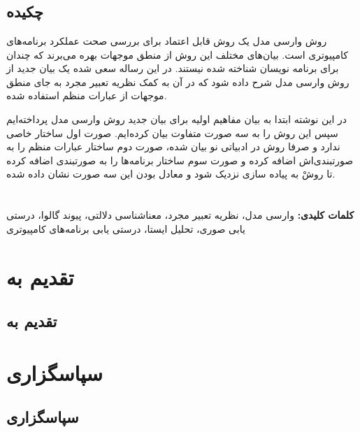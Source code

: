 \documentclass[12pt]{report}
\begin{document}
\newpage
\pagestyle{plain}
\setcounter{page}{1}
\chapter*{}
\section*{چکیده}
روش وارسی مدل یک روش قابل اعتماد برای بررسی صحت عملکرد برنامه‌های کامپیوتری است. بیان‌های مختلف این روش از منطق موجهات بهره می‌برند که چندان برای برنامه نویسان شناخته شده نیستند. در این رساله سعی شده یک بیان جدید از روش وارسی مدل شرح داده شود که در آن به کمک نظریه تعبیر مجرد به جای منطق موجهات از عبارات منظم استفاده شده.

در این نوشته ابتدا به بیان مفاهیم اولیه‌ برای بیان جدید روش وارسی مدل پرداخته‌ایم سپس این روش را به سه صورت متفاوت بیان کرده‌ایم. صورت اول ساختار خاصی ندارد و صرفا روش در ادبیاتی نو بیان شده، صورت دوم ساختار عبارات منظم را به صورتبندی‌اش اضافه کرده و صورت سوم ساختار برنامه‌ها را به صورتبندی اضافه کرده تا روشْ به پیاده سازی نزدیک شود و معادل بودن این سه صورت نشان داده شده.\\\\\\


\textbf{کلمات کلیدی:}
وارسی مدل، نظریه تعبیر مجرد، معناشناسی دلالتی، پیوند گالوا، درستی یابی صوری، تحلیل ایستا، درستی یابی برنامه‌های کامپیوتری
\chapter*{تقدیم به}
\section*{تقدیم به}

\chapter*{سپاسگزاری}
\section*{سپاسگزاری}
\end{document}
